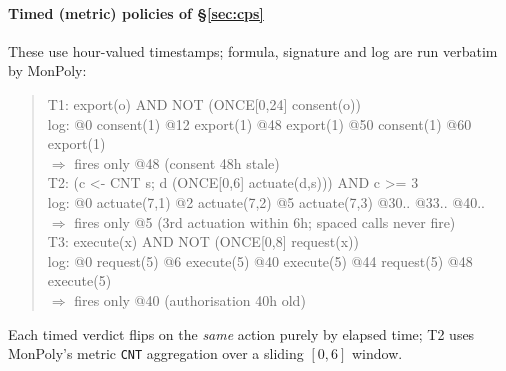 \documentclass[sigconf]{acmart}
\begin{document}
\paragraph{Timed (metric) policies of \S\ref{sec:cps}} These use hour-valued
timestamps; formula, signature and log are run verbatim by MonPoly:
\begin{quote}\ttfamily\footnotesize\raggedright
T1: export(o) AND NOT (ONCE[0,24] consent(o))\\
\hspace*{1em}log: @0 consent(1) @12 export(1) @48 export(1) @50 consent(1) @60 export(1)\\
\hspace*{1em}$\Rightarrow$ fires only @48 (consent 48h stale)\\
T2: (c <- CNT s; d (ONCE[0,6] actuate(d,s))) AND c >= 3\\
\hspace*{1em}log: @0 actuate(7,1) @2 actuate(7,2) @5 actuate(7,3) @30.. @33.. @40..\\
\hspace*{1em}$\Rightarrow$ fires only @5 (3rd actuation within 6h; spaced calls never fire)\\
T3: execute(x) AND NOT (ONCE[0,8] request(x))\\
\hspace*{1em}log: @0 request(5) @6 execute(5) @40 execute(5) @44 request(5) @48 execute(5)\\
\hspace*{1em}$\Rightarrow$ fires only @40 (authorisation 40h old)
\end{quote}
Each timed verdict flips on the \emph{same} action purely by elapsed time; T2 uses
MonPoly's metric \texttt{CNT} aggregation over a sliding $[0,6]$ window.
\end{document}
